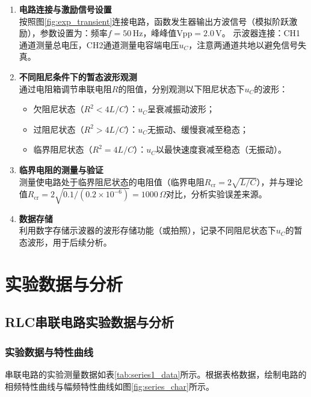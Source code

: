 \documentclass[11pt]{article}
\begin{document}
\begin{enumerate}
    \item \textbf{电路连接与激励信号设置} \\
    按照图\ref{fig:exp_transient}连接电路，函数发生器输出方波信号（模拟阶跃激励），参数设置为：频率$f=50\,\text{Hz}$，峰峰值$\text{Vpp}=2.0\,\text{V}$。
    示波器连接：CH1通道测量总电压，CH2通道测量电容端电压$u_C$，注意两通道共地以避免信号失真。

    \item \textbf{不同阻尼条件下的暂态波形观测} \\
    通过电阻箱调节串联电阻$R$的阻值，分别观测以下阻尼状态下$u_C$的波形：
    \begin{itemize}
        \item 欠阻尼状态（$R^2 < 4L/C$）：$u_C$呈衰减振动波形；
        \item 过阻尼状态（$R^2 > 4L/C$）：$u_C$无振动、缓慢衰减至稳态；
        \item 临界阻尼状态（$R^2 = 4L/C$）：$u_C$以最快速度衰减至稳态（无振动）。
    \end{itemize}

    \item \textbf{临界电阻的测量与验证} \\
    测量使电路处于临界阻尼状态的电阻值（临界电阻$R_{\text{cr}} = 2\sqrt{L/C}$），并与理论值$R_{\text{cr}}=2\sqrt{0.1/(0.2\times10^{-6})}=1000\,\Omega$对比，分析实验误差来源。

    \item \textbf{数据存储} \\
    利用数字存储示波器的波形存储功能（或拍照），记录不同阻尼状态下$u_C$的暂态波形，用于后续分析。
\end{enumerate}


\section{实验数据与分析}
\subsection{RLC串联电路实验数据与分析}

\subsubsection{实验数据与特性曲线}
串联电路的实验测量数据如表\ref{tab:series1_data}所示。根据表格数据，绘制电路的相频特性曲线与幅频特性曲线如图\ref{fig:series_char}所示。
\end{document}
